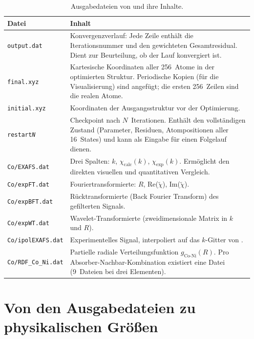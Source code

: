 \begin{table}[htbp]
  \centering
  \caption{Ausgabedateien von \evax{} und ihre Inhalte.}
  \label{tab:output-dateien}
  \small
  \begin{tabularx}{\textwidth}{lX}
    \toprule
    \textbf{Datei} & \textbf{Inhalt} \\
    \midrule
    \texttt{output.dat} &
      Konvergenzverlauf: Jede Zeile enthält die Iterationsnummer
      und den gewichteten Gesamtresidual.
      Dient zur Beurteilung, ob der Lauf konvergiert ist. \\
    \texttt{final.xyz} &
      Kartesische Koordinaten aller 256~Atome in der optimierten
      Struktur.
      Periodische Kopien (für die Visualisierung) sind angefügt;
      die ersten 256~Zeilen sind die realen Atome. \\
    \texttt{initial.xyz} &
      Koordinaten der Ausgangsstruktur vor der Optimierung. \\
    \texttt{restart\textit{N}} &
      Checkpoint nach $N$~Iterationen.
      Enthält den vollständigen Zustand (Parameter, Residuen,
      Atompositionen aller 16~States) und kann als Eingabe für
      einen Folgelauf dienen. \\
    \midrule
    \texttt{Co/EXAFS.dat} &
      Drei Spalten: $k$, $\chi_\text{calc}(k)$,
      $\chi_\text{exp}(k)$.
      Ermöglicht den direkten visuellen und quantitativen
      Vergleich. \\
    \texttt{Co/expFT.dat} &
      Fouriertransformierte: $R$, Re($\tilde\chi$),
      Im($\tilde\chi$). \\
    \texttt{Co/expBFT.dat} &
      Rücktransformierte (Back Fourier Transform) des
      gefilterten Signals. \\
    \texttt{Co/expWT.dat} &
      Wavelet-Transformierte (zweidimensionale Matrix
      in $k$ und $R$). \\
    \texttt{Co/ipolEXAFS.dat} &
      Experimentelles Signal, interpoliert auf das $k$-Gitter
      von \evax{}. \\
    \texttt{Co/RDF\_Co\_Ni.dat} &
      Partielle radiale Verteilungsfunktion $g_\text{Co-Ni}(R)$.
      Pro Absorber-Nachbar-Kombination existiert eine Datei
      (9~Dateien bei drei Elementen). \\
    \bottomrule
  \end{tabularx}
\end{table}


\section{Von den Ausgabedateien zu physikalischen Größen}

